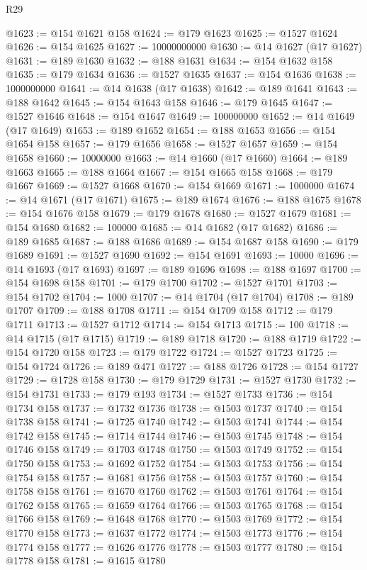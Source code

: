 \begin{lexlean}{R29}
\begin{coremodule}
@1623 := @154 @1621 @158
@1624 := @179 @1623
@1625 := @1527 @1624
@1626 := @154 @1625
@1627 := 10000000000
@1630 := @14 @1627 (@17 @1627)
@1631 := @189 @1630
@1632 := @188 @1631
@1634 := @154 @1632 @158
@1635 := @179 @1634
@1636 := @1527 @1635
@1637 := @154 @1636
@1638 := 1000000000
@1641 := @14 @1638 (@17 @1638)
@1642 := @189 @1641
@1643 := @188 @1642
@1645 := @154 @1643 @158
@1646 := @179 @1645
@1647 := @1527 @1646
@1648 := @154 @1647
@1649 := 100000000
@1652 := @14 @1649 (@17 @1649)
@1653 := @189 @1652
@1654 := @188 @1653
@1656 := @154 @1654 @158
@1657 := @179 @1656
@1658 := @1527 @1657
@1659 := @154 @1658
@1660 := 10000000
@1663 := @14 @1660 (@17 @1660)
@1664 := @189 @1663
@1665 := @188 @1664
@1667 := @154 @1665 @158
@1668 := @179 @1667
@1669 := @1527 @1668
@1670 := @154 @1669
@1671 := 1000000
@1674 := @14 @1671 (@17 @1671)
@1675 := @189 @1674
@1676 := @188 @1675
@1678 := @154 @1676 @158
@1679 := @179 @1678
@1680 := @1527 @1679
@1681 := @154 @1680
@1682 := 100000
@1685 := @14 @1682 (@17 @1682)
@1686 := @189 @1685
@1687 := @188 @1686
@1689 := @154 @1687 @158
@1690 := @179 @1689
@1691 := @1527 @1690
@1692 := @154 @1691
@1693 := 10000
@1696 := @14 @1693 (@17 @1693)
@1697 := @189 @1696
@1698 := @188 @1697
@1700 := @154 @1698 @158
@1701 := @179 @1700
@1702 := @1527 @1701
@1703 := @154 @1702
@1704 := 1000
@1707 := @14 @1704 (@17 @1704)
@1708 := @189 @1707
@1709 := @188 @1708
@1711 := @154 @1709 @158
@1712 := @179 @1711
@1713 := @1527 @1712
@1714 := @154 @1713
@1715 := 100
@1718 := @14 @1715 (@17 @1715)
@1719 := @189 @1718
@1720 := @188 @1719
@1722 := @154 @1720 @158
@1723 := @179 @1722
@1724 := @1527 @1723
@1725 := @154 @1724
@1726 := @189 @471
@1727 := @188 @1726
@1728 := @154 @1727
@1729 := @1728 @158
@1730 := @179 @1729
@1731 := @1527 @1730
@1732 := @154 @1731
@1733 := @179 @193
@1734 := @1527 @1733
@1736 := @154 @1734 @158
@1737 := @1732 @1736
@1738 := @1503 @1737
@1740 := @154 @1738 @158
@1741 := @1725 @1740
@1742 := @1503 @1741
@1744 := @154 @1742 @158
@1745 := @1714 @1744
@1746 := @1503 @1745
@1748 := @154 @1746 @158
@1749 := @1703 @1748
@1750 := @1503 @1749
@1752 := @154 @1750 @158
@1753 := @1692 @1752
@1754 := @1503 @1753
@1756 := @154 @1754 @158
@1757 := @1681 @1756
@1758 := @1503 @1757
@1760 := @154 @1758 @158
@1761 := @1670 @1760
@1762 := @1503 @1761
@1764 := @154 @1762 @158
@1765 := @1659 @1764
@1766 := @1503 @1765
@1768 := @154 @1766 @158
@1769 := @1648 @1768
@1770 := @1503 @1769
@1772 := @154 @1770 @158
@1773 := @1637 @1772
@1774 := @1503 @1773
@1776 := @154 @1774 @158
@1777 := @1626 @1776
@1778 := @1503 @1777
@1780 := @154 @1778 @158
@1781 := @1615 @1780

\end{coremodule}
\end{lexlean}
